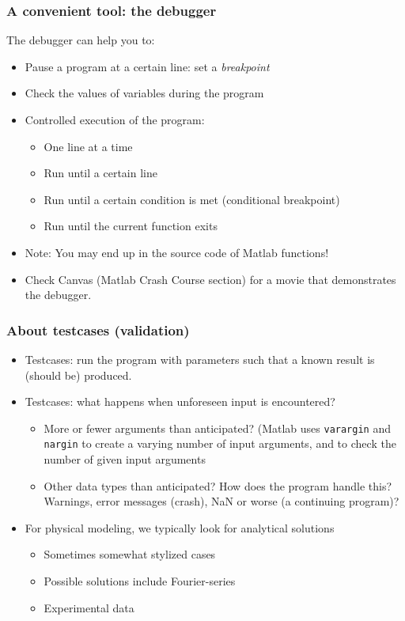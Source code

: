\documentclass[11pt,table,final,fleqn,xcolor={usenames,dvipsnames},unknownkeysallowed,handout]{beamer}
\begin{document}
\begin{frame}
\frametitle{A convenient tool: the debugger}
The debugger can help you to:
\begin{itemize}
  \item Pause a program at a certain line: set a \emph{breakpoint}
  \item Check the values of variables during the program
  \item Controlled execution of the program:
  \begin{itemize}
    \item One line at a time
    \item Run until a certain line
    \item Run until a certain condition is met (conditional breakpoint)
    \item Run until the current function exits
  \end{itemize}
  \item Note: You may end up in the source code of Matlab functions!\pause
  \item Check Canvas (Matlab Crash Course section) for a movie that demonstrates the debugger.
\end{itemize}
\end{frame}
% 
\begin{frame}
  \frametitle{About testcases (validation)}
  \begin{itemize}
    \item Testcases: run the program with parameters such that a known result is (should be) produced.
    \item Testcases: what happens when unforeseen input is encountered?
    \begin{itemize}
      \item More or fewer arguments than anticipated? (Matlab uses \lstinline$varargin$ and \lstinline$nargin$ to create a varying number of input arguments, and to check the number of given input arguments
      \item Other data types than anticipated? How does the program handle this? Warnings, error messages (crash), NaN or worse (a continuing program)?
    \end{itemize}
    \item For physical modeling, we typically look for analytical solutions
    \begin{itemize}
      \item Sometimes somewhat stylized cases
      \item Possible solutions include Fourier-series
      \item Experimental data
    \end{itemize}

  \end{itemize}
\end{frame}
% 
\end{document}
